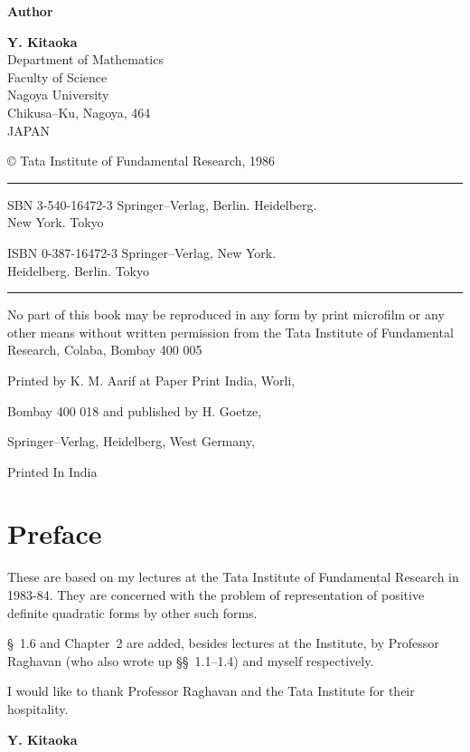 \thispagestyle{empty}
\begin{center}
{\bf Author}

{\large\bf Y. Kitaoka}\\
Department of Mathematics\\
Faculty of Science\\
Nagoya University\\
Chikusa--Ku, Nagoya, 464\\
JAPAN
\vfill

\copyright \; Tata Institute of Fundamental Research, 1986\\
\vfill

\noindent\rule\textwidth{1pt}

ISBN 3-540-16472-3 Springer--Verlag, Berlin. Heidelberg.\\ 
New York. Tokyo

ISBN 0-387-16472-3 Springer--Verlag, New York.\\ 
Heidelberg. Berlin. Tokyo

\noindent\rule\textwidth{1pt}
\vfill

\parbox{0.7\textwidth}{%
No part of this book may be reproduced in any form
by print microfilm or any other means without written
permission from the Tata Institute of Fundamental
Research, Colaba, Bombay 400 005}
\vfill

Printed by K. M. Aarif at Paper Print India, Worli,

Bombay 400 018 and published by H. Goetze,

Springer--Verlag, Heidelberg, West Germany,
\vfill

Printed In India
\end{center}
\eject

\chapter{Preface}

These are based on my lectures at the Tata Institute of Fundamental
Research in 1983-84. They are concerned with the problem of
representation of positive definite quadratic forms by other such
forms. 

\S~1.6 and Chapter~2 are added, besides lectures at the Institute, by
Professor Raghavan (who also wrote up \S\S~1.1--1.4) and myself
respectively.

I would like to thank Professor Raghavan and the Tata Institute for
their hospitality.
\vskip 1cm

\hfill {\large\bf Y. Kitaoka}\qquad\, 
